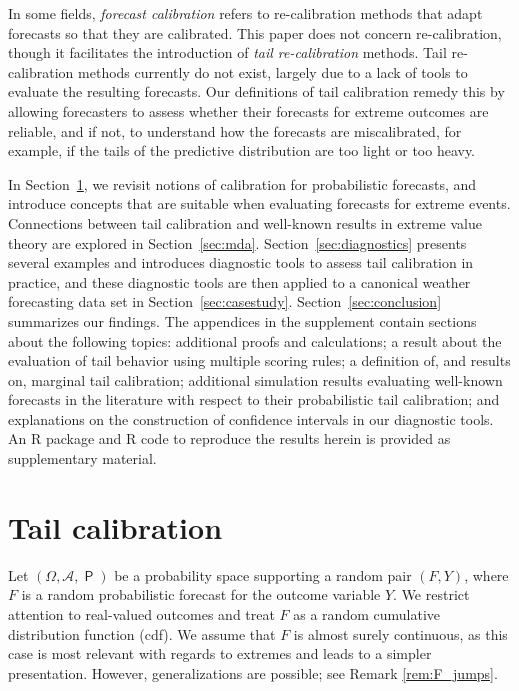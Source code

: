 \documentclass[12pt]{article}
\newcommand{\Q}{\operatorname{\mathsf{P}}}
\newcommand{\Aa}{\mathcal{A}}
\newcommand{\1}{\mathbf{1}} %
\theoremstyle{definition}
\begin{document}
In some fields, \emph{forecast calibration} refers to re-calibration methods that adapt forecasts so that they are calibrated. This paper does not concern re-calibration, though it facilitates the introduction of \emph{tail re-calibration} methods. Tail re-calibration methods currently do not exist, largely due to a lack of tools to evaluate the resulting forecasts. Our definitions of tail calibration remedy this by allowing forecasters to assess whether their forecasts for extreme outcomes are reliable, and if not, to understand how the forecasts are miscalibrated, for example, if the tails of the predictive distribution are too light or too heavy.

In Section~\ref{sec:calib}, we revisit notions of calibration for probabilistic forecasts, and introduce concepts that are suitable when evaluating forecasts for extreme events. Connections between tail calibration and well-known results in extreme value theory are explored in Section~\ref{sec:mda}. Section~\ref{sec:diagnostics} presents several examples and introduces diagnostic tools to assess tail calibration in practice, and these diagnostic tools are then applied to a canonical weather forecasting data set in Section~\ref{sec:casestudy}. Section~\ref{sec:conclusion} summarizes our findings. The appendices in the supplement contain sections about the following topics: additional proofs and calculations; a result about the evaluation of tail behavior using multiple scoring rules; a definition of, and results on, marginal tail calibration; additional simulation results evaluating well-known forecasts in the literature with respect to their probabilistic tail calibration; and explanations on the construction of confidence intervals in our diagnostic tools. An R package and R code to reproduce the results herein is provided as supplementary material.


\section{Tail calibration}\label{sec:calib}

Let $( \Omega, \Aa, \Q )$ be a probability space supporting a random pair
$
(F, Y)
$, where $F$ is a random probabilistic forecast for the outcome variable $Y$. We restrict attention to real-valued outcomes and treat $F$ as a random cumulative distribution function (cdf). We assume that $F$ is almost surely continuous, as this case is most relevant with regards to extremes and leads to a simpler presentation. However, generalizations are possible; see Remark \ref{rem:F_jumps}.
\end{document}
